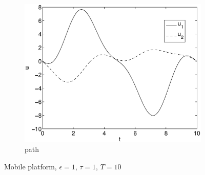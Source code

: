 \begin{figure}[h]
\begin{subfigure}[b]{\textwidth}
\centering
\includegraphics[height=0.3\textheight]{img/final_1_1_10_u.eps}
\caption{path}
\end{subfigure}
\caption{Mobile platform, $\epsilon=1$, $\tau=1$, $T=10$}
\label{fig:pl7}
\end{figure}

